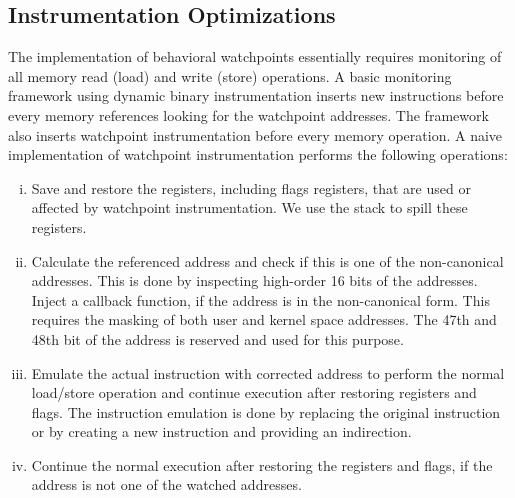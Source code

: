 


\subsection {Instrumentation Optimizations}
The implementation of behavioral watchpoints essentially requires monitoring of all memory read (load) and write (store) operations. A basic monitoring framework using dynamic binary instrumentation inserts new instructions before every memory references looking for the watchpoint addresses. The framework also inserts watchpoint instrumentation before every memory operation. A naive implementation of watchpoint instrumentation performs the following operations:
\begin{enumerate}[i)]
	\item Save and restore the registers, including flags registers, that are used or affected by watchpoint instrumentation. We use the stack to spill these registers. 
	\item Calculate the referenced address and check if this is one of the non-canonical addresses. This is done by inspecting high-order 16 bits of the addresses. Inject a callback function, if the address is in the non-canonical form. This requires the masking of both user and kernel space addresses. The 47th and 48th bit of the address is reserved and used for this purpose.
	\item Emulate the actual instruction with corrected address to perform the normal load/store operation and continue execution after restoring registers and flags. The instruction emulation is done by replacing the original instruction or by creating a new instruction and providing an indirection.
	\item Continue the normal execution after restoring the registers and flags, if the address is not one of the watched addresses.
\end{enumerate}

